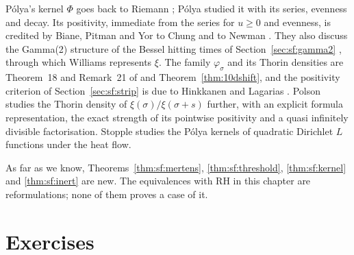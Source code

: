 P\'olya's kernel $\Phi$ goes back to Riemann \cite{riemann1859}; P\'olya \cite{polya1926} studied it with its series, evenness and decay. Its positivity, immediate from the series for $u\ge0$ and evenness, is credited by Biane, Pitman and Yor \cite[Section~2.2]{bpy2001} to Chung and to Newman \cite{newman1976}. They also discuss the Gamma(2) structure of the Bessel hitting times of Section~\ref{sec:sf:gamma2} \cite[(6) to (8) and Table~2]{bpy2001}, through which Williams \cite[Section~5]{williams1990} represents $\xi$. The family $\varphi_\sigma$ and its Thorin densities are Theorem~18 and Remark~21 of \cite{polson2018vdp} and Theorem~\ref{thm:10dshift}, and the positivity criterion of Section~\ref{sec:sf:strip} is due to Hinkkanen \cite{hinkkanen1997} and Lagarias \cite{lagarias1999}. Polson \cite{polson2026thorin} studies the Thorin density of $\xi(\sigma)/\xi(\sigma+s)$ further, with an explicit formula representation, the exact strength of its pointwise positivity and a quasi infinitely divisible factorisation. Stopple \cite{stopple2014} studies the P\'olya kernels of quadratic Dirichlet $L$ functions under the heat flow.

As far as we know, Theorems~\ref{thm:sf:mertens}, \ref{thm:sf:threshold}, \ref{thm:sf:kernel} and \ref{thm:sf:inert} are new. The equivalences with RH in this chapter are reformulations; none of them proves a case of it.

\section{Exercises}

